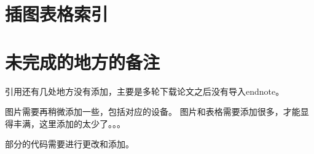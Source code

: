 \chapter{插图表格索引}
\listoffigures
\listoftables

\chapter{未完成的地方的备注}
引用还有几处地方没有添加，主要是多轮下载论文之后没有导入endnote。

图片需要再稍微添加一些，包括对应的设备。
图片和表格需要添加很多，才能显得丰满，这里添加的太少了。。。


部分的代码需要进行更改和添加。




